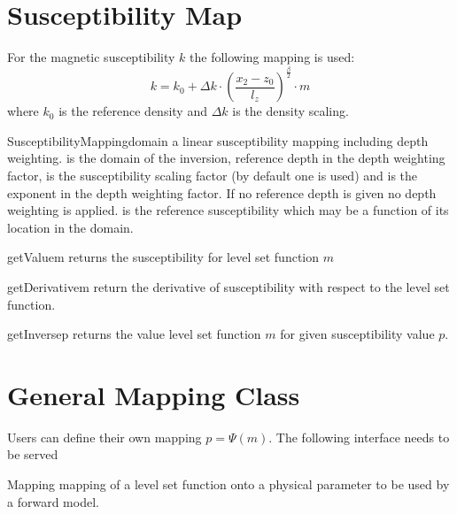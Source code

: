 \section{Susceptibility Map}\label{Chp:ref:mapping susceptibility}
For the magnetic susceptibility $k$ the following mapping is used:
\begin{equation}\label{EQU:MAP:2}
k=  k_{0} + \Delta k \cdot \left( \frac{x_2 - z_0}{l_z} \right)^{\frac{\beta}{2}}  \cdot m 
\end{equation}  
where $k_{0}$ is the reference density and $\Delta k$ is the density scaling.

\begin{classdesc}{SusceptibilityMapping}{domain
        }
a linear susceptibility mapping including depth weighting.
 is the domain of the inversion,  reference depth in
the depth weighting factor,  is the susceptibility scaling factor
(by default one is used) and  is the exponent in the depth
weighting factor. If no reference depth  is given no depth
weighting is applied.
 is the reference susceptibility which may be a function of its
location in the domain. 
\end{classdesc}

\begin{methoddesc}[SusceptibilityMapping]{getValue}{m}
returns the susceptibility for level set function $m$
\end{methoddesc}

\begin{methoddesc}[SusceptibilityMapping]{getDerivative}{m}
return the derivative of susceptibility  with respect to the level set function.
\end{methoddesc}  

\begin{methoddesc}[SusceptibilityMapping]{getInverse}{p}
returns the value level set function $m$ for given susceptibility value $p$.
\end{methoddesc}


\section{General Mapping Class}
Users can define their own mapping $p=\Psi(m)$.
The following interface needs to be served

\begin{classdesc}{Mapping}{}
mapping of a level set function onto a physical parameter to be used by a
forward model.
\end{classdesc} 

